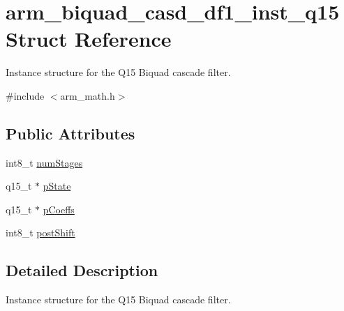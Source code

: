 \hypertarget{structarm__biquad__casd__df1__inst__q15}{\section{arm\-\_\-biquad\-\_\-casd\-\_\-df1\-\_\-inst\-\_\-q15 Struct Reference}
\label{structarm__biquad__casd__df1__inst__q15}
}


Instance structure for the Q15 Biquad cascade filter.  




{\ttfamily \#include $<$arm\-\_\-math.\-h$>$}

\subsection*{Public Attributes}
\begin{DoxyCompactItemize}
\item 
int8\-\_\-t \hyperlink{structarm__biquad__casd__df1__inst__q15_ad6d95e70abcf4ff1300181415ad92153}{num\-Stages}
\item 
q15\-\_\-t $\ast$ \hyperlink{structarm__biquad__casd__df1__inst__q15_a5481104ef2f8f81360b80b47d69ae932}{p\-State}
\item 
q15\-\_\-t $\ast$ \hyperlink{structarm__biquad__casd__df1__inst__q15_a1edaacdebb5b09d7635bf20c779855fc}{p\-Coeffs}
\item 
int8\-\_\-t \hyperlink{structarm__biquad__casd__df1__inst__q15_ada7e9d6269e6ed4eacf8f68729e9832d}{post\-Shift}
\end{DoxyCompactItemize}


\subsection{Detailed Description}
Instance structure for the Q15 Biquad cascade filter. 

